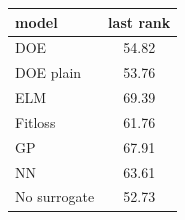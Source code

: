 \begin{tabular}{|lc|}
\hline
model & last rank\\
\hline
DOE & 54.82 \\
DOE plain & 53.76 \\
ELM & 69.39 \\
Fitloss & 61.76 \\
GP & 67.91 \\
NN & 63.61 \\
No surrogate & 52.73 \\
\hline
\end{tabular}
